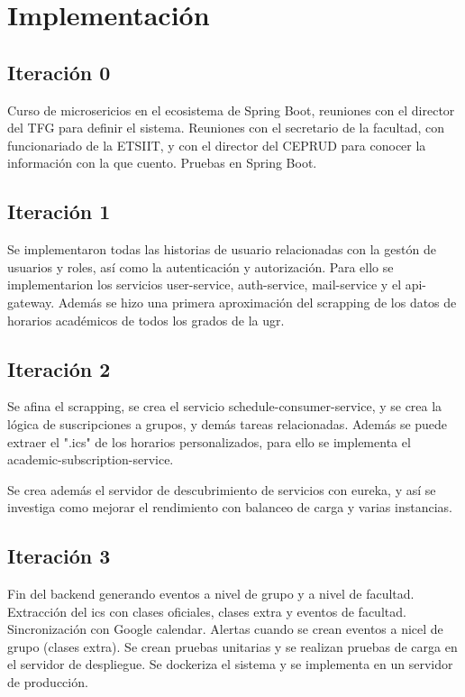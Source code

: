 \chapter{Implementación}\label{cap:implementacion}

\section{Iteración 0}

Curso de microsericios en el ecosistema de Spring Boot, reuniones con el director del TFG para definir el sistema.
Reuniones con el secretario de la facultad, con funcionariado de la ETSIIT, y con el director del CEPRUD para conocer  la información con la que cuento.
Pruebas en Spring Boot.

\section{Iteración 1}

Se implementaron todas las historias de usuario relacionadas con la gestón de usuarios y roles, así como la autenticación y autorización. Para ello
se implementarion los servicios user-service, auth-service, mail-service y el api-gateway.
Además se hizo una primera aproximación del scrapping de los datos de horarios académicos de todos los grados de la ugr.

\section{Iteración 2}

Se afina el scrapping, se crea el servicio schedule-consumer-service, y se crea la lógica de suscripciones a grupos, y demás tareas relacionadas. Además se puede extraer el ".ics"
de los horarios personalizados, para ello se implementa el academic-subscription-service.

Se crea además el servidor de descubrimiento de servicios con eureka, y así se investiga como mejorar el rendimiento con balanceo de carga y varias instancias.

\section{Iteración 3}

Fin del backend generando eventos a nivel de grupo y a nivel de facultad. Extracción del ics con clases oficiales, clases extra y eventos de facultad. Sincronización con Google calendar.
Alertas cuando se crean eventos a nicel de grupo (clases extra).
Se crean pruebas unitarias y se realizan pruebas de carga en el servidor de despliegue.
Se dockeriza el sistema y se implementa en un servidor de producción.

